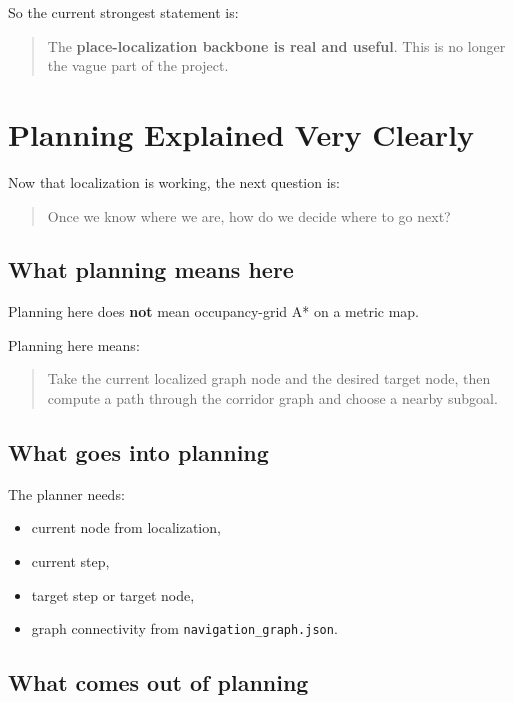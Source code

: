 \documentclass[11pt,a4paper]{article}
\begin{document}
So the current strongest statement is:

\begin{quote}
The \textbf{place-localization backbone is real and useful}.  This is no longer
the vague part of the project.
\end{quote}


\section{Planning Explained Very Clearly}

Now that localization is working, the next question is:

\begin{quote}
Once we know where we are, how do we decide where to go next?
\end{quote}

\subsection{What planning means here}

Planning here does \textbf{not} mean occupancy-grid A* on a metric map.

Planning here means:

\begin{quote}
Take the current localized graph node and the desired target node, then compute
a path through the corridor graph and choose a nearby subgoal.
\end{quote}

\subsection{What goes into planning}

The planner needs:

\begin{itemize}[nosep]
  \item current node from localization,
  \item current step,
  \item target step or target node,
  \item graph connectivity from \texttt{navigation\_graph.json}.
\end{itemize}

\subsection{What comes out of planning}
\end{document}
